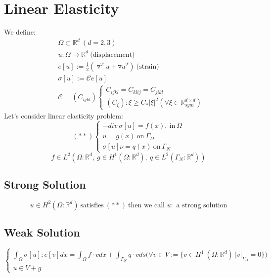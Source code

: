 \documentclass[a4paper,12pt]{article}
\newcommand{\R}{\mathbb{R}}
\newcommand{\Cmod}{\mathcal{C}}
\begin{document}
\section{Linear Elasticity}
We define:
\begin{equation*}
\begin{aligned}
&\Omega \subset \R^d\ (d=2,3)\\
&u:\Omega \rightarrow \R^d\ \text{(displacement)}\\
&e[u]:= \frac{1}{2}(\triangledown^T u + \triangledown u^T)\ \text{(strain)}\\
&\sigma[u]:=\Cmod e[u]\\
&\Cmod=(C_{ijkl})\begin{cases}
C_{ijkl}=C_{klij}=C_{jikl}\\
(C_\xi):\xi \geq C_* |\xi|^2 (\forall \xi \in \R_{sym}^{d\times d})
\end{cases}
\end{aligned}
\end{equation*}
Let's consider linear elasticity problem:
\begin{equation}\label{linearelcase}
(**)\begin{cases}
-div\ \sigma[u]=f(x),\ \text{in}\ \Omega\\
u=g(x)\ \text{on}\ \Gamma_D\\
\sigma[u] \nu = q(x)\ \text{on}\ \Gamma_N
\end{cases}
\end{equation}
\begin{equation*}
f \in L^2(\Omega : \R^d,\ g\in H^1(\Omega : \R^d),\ q\in L^2(\Gamma_N:\R^d))
\end{equation*}
\subsection{Strong Solution}
\begin{equation*}
u\in H^2 (\Omega : \R^d)\ \text{satisfies}\ (**)\ \text{then we call $u:$ a strong solution}
\end{equation*}
\subsection{Weak Solution}
\begin{equation*}
\begin{cases}
\int_\Omega \sigma[u] : e[v] dx = \int_\Omega f\cdot v dx + \int_{\Gamma_N} q\cdot v ds \big( \forall v \in V:= \{ v \in H^1\ (\Omega : \R^d)\ |v|_{\Gamma_D} = 0 \}\big)\\
u \in V+g
\end{cases}
\end{equation*}
\end{document}
